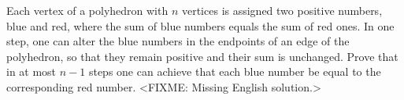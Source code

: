 \problem
Each vertex of a polyhedron with $n$ vertices is assigned two positive numbers,
blue and red, where the sum of blue numbers equals the sum of red ones.
In one step, one can alter the blue numbers in the endpoints of an edge of the
polyhedron, so that they remain positive and their sum is unchanged.
Prove that in at most $n-1$ steps one can achieve that each blue number be
equal to the corresponding red number.
\solution
<FIXME: Missing English solution.>
\endproblem
